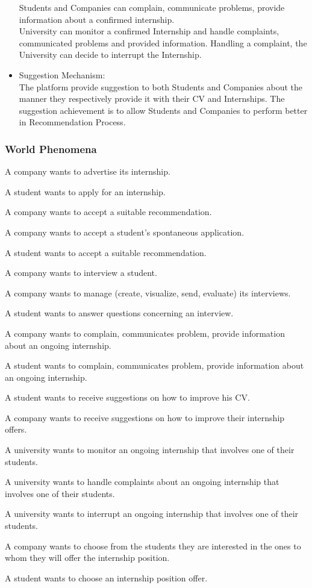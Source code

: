 \begin{itemize}
    Students and Companies can complain, communicate problems, provide information about a confirmed internship.\\
    University can monitor a confirmed Internship and handle complaints, communicated problems and provided information.
    Handling a complaint, the University can decide to interrupt the Internship.
\item {\color{titleColor}Suggestion Mechanism:}\\
    The platform provide suggestion to both Students and Companies about the manner they respectively provide it with their CV and Internships. The suggestion achievement is to allow Students and Companies to perform better in Recommendation Process.
\end{itemize}

\subsubsection{World Phenomena}
\begin{enumerate}[label={\color{titleColor}[WP\arabic*]}]
\item A company wants to advertise its internship.
\item A student wants to apply for an internship.
\item A company wants to accept a suitable recommendation.
\item A company wants to accept a student's spontaneous application.
\item A student wants to accept a suitable recommendation.
\item A company wants to interview a student.
\item A company wants to manage (create, visualize, send, evaluate) its interviews.
\item A student wants to answer questions concerning an interview.
\item A company wants to complain, communicates problem, provide information about an ongoing internship.
\item A student wants to complain, communicates problem, provide information about an ongoing internship.
\item A student wants to receive suggestions on how to improve his CV.
\item A company wants to receive suggestions on how to improve their internship offers.
\item A university wants to monitor an ongoing internship that involves one of their students.
\item A university wants to handle complaints about an ongoing internship that involves one of their students.
\item A university wants to interrupt an ongoing internship that involves one of their students.
\item A company wants to choose from the students they are interested in the ones to whom they will offer the internship position.
\item A student wants to choose an internship position offer.

\end{enumerate}
